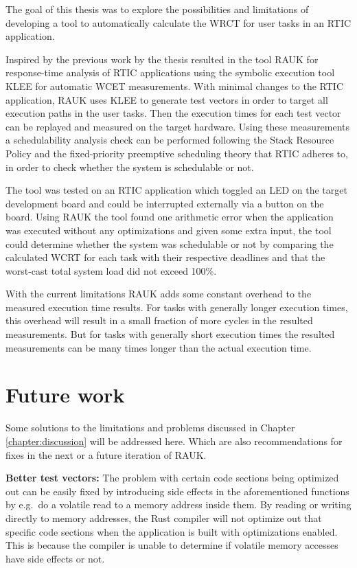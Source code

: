The goal of this thesis was to explore the possibilities and limitations of
developing a tool to automatically calculate the WRCT for user tasks in an
RTIC application.

Inspired by the previous work by \cite{lindner} the thesis resulted in the tool
RAUK for response-time analysis of RTIC applications using the symbolic
execution tool KLEE for automatic WCET measurements. With minimal changes to
the RTIC application, RAUK uses KLEE to generate test vectors in order to
target all execution paths in the user tasks. Then the execution times for each
test vector can be replayed and measured on the target hardware. Using these
measurements a schedulability analysis check can be performed following the Stack
Resource Policy and the fixed-priority preemptive scheduling theory that RTIC
adheres to, in order to check whether the system is schedulable or not.

The tool was tested on an RTIC application which toggled an LED on the
target development board and could be interrupted externally via a button
on the board. Using RAUK the tool found one arithmetic error when the
application was executed without any optimizations and given some extra input,
the tool could determine whether the system was schedulable or not by comparing
the calculated WCRT for each task with their respective deadlines and that the
worst-cast total system load did not exceed 100\%.

With the current limitations RAUK adds some constant overhead to the measured
execution time results. For tasks with generally longer execution times, this
overhead will result in a small fraction of more cycles in the resulted
measurements. But for tasks with generally short execution times the resulted
measurements can be many times longer than the actual execution time.

\section{Future work}
Some solutions to the limitations and problems discussed in Chapter
\ref{chapter:discussion} will be addressed here. Which are also recommendations
for fixes in the next or a future iteration of RAUK.

\textbf{Better test vectors:} The problem with certain code sections being
optimized out can be easily fixed by introducing side effects in the
aforementioned functions by e.g.\ do a volatile read to a memory address inside
them. By reading or writing directly to memory addresses, the Rust compiler
will not optimize out that specific code sections when the application is built
with optimizations enabled. This is because the compiler is unable to determine
if volatile memory accesses have side effects or not.

